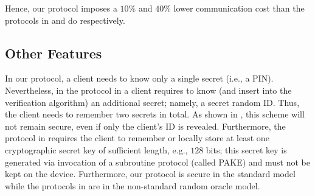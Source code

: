 Hence, our protocol imposes a $10\%$ and $40\%$ lower communication cost than the protocols in \cite{WangW18} and \cite{JareckiJKSS21} do respectively.

\vspace{-2mm}
\subsection{Other Features}

 In our protocol, a client needs to know only a single secret (i.e., a  PIN). Nevertheless, in the protocol in \cite{WangW18} a client requires to know (and insert into the verification algorithm) an additional secret; namely, a secret random ID. Thus, the client needs to remember two secrets in total.  As shown in \cite{Scott12a}, this scheme will not remain secure, even if only the client's ID is revealed. Furthermore, the protocol in \cite{JareckiJKSS21} requires the client to remember or locally store at least one cryptographic secret key of sufficient length, e.g., $128$ bits; this secret key is generated via invocation of a subroutine protocol (called PAKE) and must not be kept on the device. 
 Furthermore, our protocol is secure in the standard model while the protocols in \cite{WangW18,JareckiJKSS21} are in the non-standard random oracle model. 

